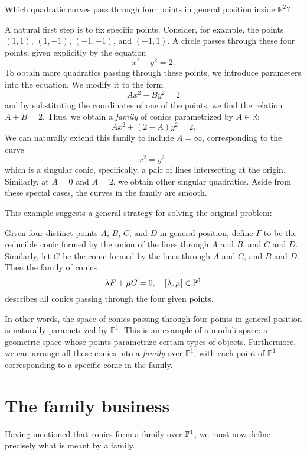 \documentclass[12pt]{memoir}
\begin{document}
\begin{significant} Which quadratic curves pass through four points in general position inside $\mathbb{R}^2$? \end{significant}

A natural first step is to fix specific points. Consider, for example, the points $(1,1)$, $(1,-1)$, $(-1,-1)$, and $(-1,1)$. A circle passes through these four points, given explicitly by the equation
$$x^2+y^2=2.$$
To obtain more quadratics passing through these points, we introduce parameters into the equation. We modify it to the form
$$Ax^2+By^2=2$$
and by substituting the coordinates of one of the points, we find the relation $A + B = 2$. Thus, we obtain a \emph{family} of conics parametrized by $A \in \mathbb{R}$:
$$Ax^2+(2-A)y^2=2.$$
We can naturally extend this family to include $A = \infty$, corresponding to the curve
$$x^2=y^2,$$
which is a singular conic, specifically, a pair of lines intersecting at the origin. Similarly, at $A=0$ and $A=2$, we obtain other singular quadratics. Aside from these special cases, the curves in the family are smooth.\par
This example suggests a general strategy for solving the original problem:
\begin{ptcb}
Given four distinct points $A$, $B$, $C$, and $D$ in general position, define $F$ to be the reducible conic formed by the union of the lines through $A$ and $B$, and $C$ and $D$. Similarly, let $G$ be the conic formed by the lines through $A$ and $C$, and $B$ and $D$. Then the family of conics
$$\lambda F+\mu G=0,\quad [\lambda,\mu]\in\mathbb{P}^1$$
describes all conics passing through the four given points.
\end{ptcb}

In other words, the space of conics passing through four points in general position is naturally parametrized by $\mathbb{P}^1$. This is an example of a moduli space: a geometric space whose points parametrize certain types of objects. Furthermore, we can arrange all these conics into a \emph{family} over $\mathbb{P}^1$, with each point of $\mathbb{P}^1$ corresponding to a specific conic in the family.

\section{The family business}
Having mentioned that conics form a family over $\mathbb{P}^1$, we must now define precisely what is meant by a family.
\end{document}
